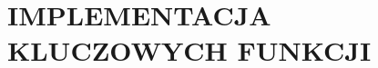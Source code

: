 \section{IMPLEMENTACJA KLUCZOWYCH FUNKCJI}



\FloatBarrier



\FloatBarrier



\FloatBarrier



\FloatBarrier



\FloatBarrier

